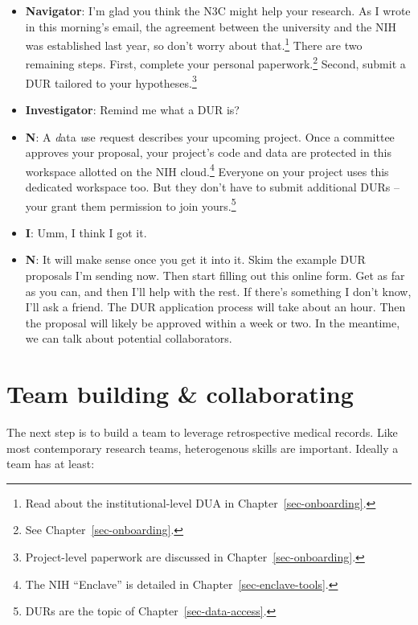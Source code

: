 \documentclass[
  letterpaper,
  DIV=11,
  numbers=noendperiod]{scrreprt}
\begin{document}
\begin{itemize}
\item
  \textbf{Navigator}: I'm glad you think the N3C might help your
  research. As I wrote in this morning's email, the agreement between
  the university and the NIH was established last year, so don't worry
  about that.\footnote{Read about the institutional-level DUA in
    Chapter~\ref{sec-onboarding}.} There are two remaining steps. First,
  complete your personal paperwork.\footnote{See
    Chapter~\ref{sec-onboarding}.} Second, submit a DUR tailored to your
  hypotheses.\footnote{Project-level paperwork are discussed in
    Chapter~\ref{sec-onboarding}.}
\item
  \textbf{Investigator}: Remind me what a DUR is?
\item
  \textbf{N}: A \emph{d}ata \emph{u}se \emph{r}equest describes your
  upcoming project. Once a committee approves your proposal, your
  project's code and data are protected in this workspace allotted on
  the NIH cloud.\footnote{The NIH ``Enclave'' is detailed in
    Chapter~\ref{sec-enclave-tools}.} Everyone on your project uses this
  dedicated workspace too. But they don't have to submit additional DURs
  --your grant them permission to join yours.\footnote{DURs are the
    topic of Chapter~\ref{sec-data-access}.}
\item
  \textbf{I}: Umm, I think I got it.
\item
  \textbf{N}: It will make sense once you get it into it. Skim the
  example DUR proposals I'm sending now. Then start filling out this
  online form. Get as far as you can, and then I'll help with the rest.
  If there's something I don't know, I'll ask a friend. The DUR
  application process will take about an hour. Then the proposal will
  likely be approved within a week or two. In the meantime, we can talk
  about potential collaborators.
\end{itemize}

\hypertarget{sec-story-team}{%
\section{Team building \& collaborating}\label{sec-story-team}}

The next step is to build a team to leverage retrospective medical
records. Like most contemporary research teams, heterogenous skills are
important. Ideally a team has at least:
\end{document}
